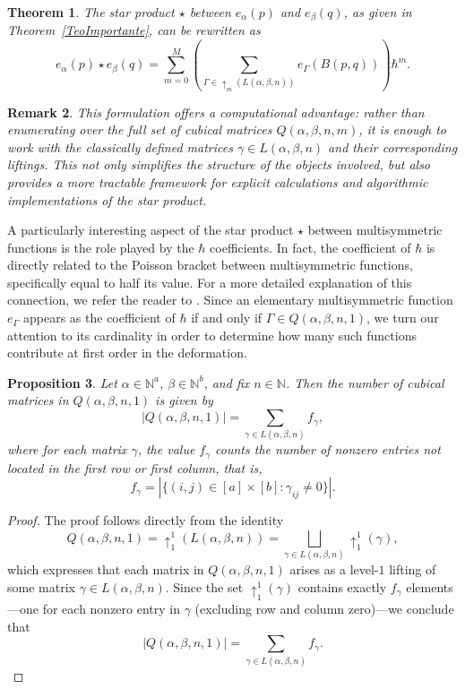 \documentclass[11pt]{article}
\newtheorem{thm}{Theorem}%
\newtheorem{prop}[thm]{Proposition} %
\newtheorem{rem}[thm]{Remark}
\begin{document}
\begin{thm}\label{PropestrellaFromL}
    The star product $\star$ between $e_\alpha(p)$ and $e_\beta(q)$, as given in Theorem~\ref{TeoImportante}, can be rewritten as
    $$
    e_\alpha(p)\star e_\beta(q)=\sum_{m=0}^{M}\left(\sum_{\Gamma\in \uparrow_{m}(L(\alpha,\beta,n))} e_\Gamma(B(p,q))\right)\hbar^m.
    $$
\end{thm}
\begin{rem}
    This formulation offers a computational advantage: rather than enumerating over the full set of cubical matrices $ Q(\alpha, \beta, n, m) $, it is enough to work with the classically defined matrices $ \gamma \in L(\alpha, \beta, n)$ and their corresponding liftings. This not only simplifies the structure of the objects involved, but also provides a more tractable framework for explicit calculations and algorithmic implementations of the star product.
\end{rem}





A particularly interesting aspect of the star product \( \star \) between multisymmetric functions is the role played by the \( \hbar \) coefficients. In fact, the coefficient of \( \hbar \) is directly related to the Poisson bracket between multisymmetric functions, specifically equal to half its value. For a more detailed explanation of this connection, we refer the reader to \cite{Kon}. Since an elementary multisymmetric function \( e_\Gamma \) appears as the coefficient of \( \hbar \) if and only if \( \Gamma \in Q(\alpha, \beta, n, 1) \), we turn our attention to its cardinality in order to determine how many such functions contribute at first order in the deformation.






\begin{prop} 
Let \( \alpha \in \mathbb{N}^a \), \( \beta \in \mathbb{N}^b \), and fix \( n \in \mathbb{N} \). Then the number of cubical matrices in \( Q(\alpha, \beta, n, 1) \) is given by
\[
|Q(\alpha, \beta, n, 1)| = \sum_{\gamma \in L(\alpha, \beta, n)} f_\gamma,
\]
where for each matrix \( \gamma \), the value \( f_\gamma \) counts the number of nonzero entries not located in the first row or first column, that is,
\[
f_\gamma = \left| \{ (i, j) \in [a] \times [b] : \gamma_{ij} \neq 0 \} \right|.
\]
\end{prop}



\begin{proof}
The proof follows directly from the identity
\[
Q(\alpha, \beta, n, 1)=\uparrow_{1}^{1}(L(\alpha,\beta,n))=\bigsqcup_{\gamma\in L(\alpha,\beta,n)}\uparrow_{1}^{1}(\gamma),
\]
which expresses that each matrix in $Q(\alpha, \beta, n, 1)$ arises as a level-$1$ lifting of some matrix $\gamma \in L(\alpha, \beta, n)$. Since the set $\uparrow_{1}^{1}(\gamma)$ contains exactly $f_\gamma$ elements—one for each nonzero entry in $\gamma$ (excluding row and column zero)—we conclude that
\[
|Q(\alpha, \beta, n, 1)| = \sum_{\gamma\in L(\alpha,\beta,n)} f_\gamma.
\]
\end{proof}
\end{document}
